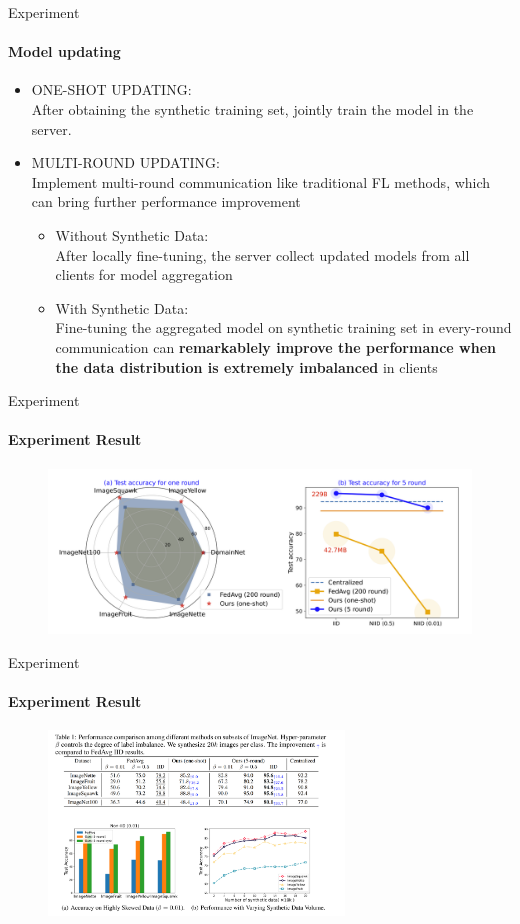 \documentclass{beamer}
\begin{document}
\begin{frame}{Experiment}
\framesubtitle{Model updating}
	\begin{itemize}
	\item ONE-SHOT UPDATING: \\
	After obtaining the synthetic training set, jointly train the model in the server.
	\item MULTI-ROUND UPDATING: \\
	Implement multi-round communication like traditional FL methods, which can
	bring further performance improvement
		\begin{itemize}
		\item Without Synthetic Data: \\
		After
		locally fine-tuning, the server collect updated models from all clients for model aggregation
		\item With Synthetic Data: \\
		Fine-tuning the
		aggregated model on synthetic training set in every-round communication can \textbf{remarkablely improve
		the performance when the data distribution is extremely imbalanced} in clients
		\end{itemize}
	\end{itemize}
\end{frame}

\begin{frame}{Experiment}
\framesubtitle{Experiment Result}
	\begin{figure}
	\centering
	\includegraphics[width=1.0\textwidth]
	{assets/performance}
	\end{figure}
\end{frame}

\begin{frame}{Experiment}
\framesubtitle{Experiment Result}
	\begin{figure}
	\centering
	\includegraphics[width=0.7\textwidth]
	{assets/result}
	\end{figure}
\end{frame}
\end{document}
